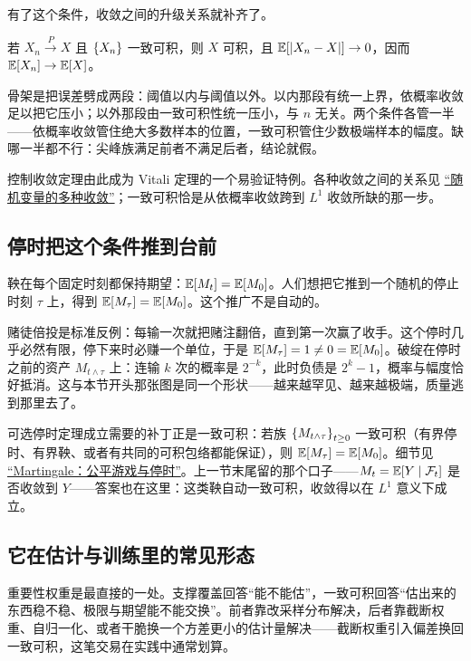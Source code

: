 有了这个条件，收敛之间的升级关系就补齐了。

\begin{theorem}[Vitali]
若 \(X_n\xrightarrow{\;P\;}X\) 且 \(\left\{X_n\right\}\) 一致可积，则 \(X\) 可积，且 \(\mathbb{E}[\left|X_n-X\right|]\to 0\)，因而 \(\mathbb{E}[X_n]\to\mathbb{E}[X]\)。
\end{theorem}

骨架是把误差劈成两段：阈值以内与阈值以外。以内那段有统一上界，依概率收敛足以把它压小；以外那段由一致可积性统一压小，与 \(n\) 无关。两个条件各管一半——依概率收敛管住绝大多数样本的位置，一致可积管住少数极端样本的幅度。缺哪一半都不行：尖峰族满足前者不满足后者，结论就假。

控制收敛定理由此成为 Vitali 定理的一个易验证特例。各种收敛之间的关系见 \hyperref[sec:05-Probability/08-Limit-Theorems/01]{``随机变量的多种收敛''}；一致可积恰是从依概率收敛跨到 \(L^1\) 收敛所缺的那一步。

\subsection{停时把这个条件推到台前}

鞅在每个固定时刻都保持期望：\(\mathbb{E}[M_t]=\mathbb{E}[M_0]\)。人们想把它推到一个随机的停止时刻 \(\tau\) 上，得到 \(\mathbb{E}[M_\tau]=\mathbb{E}[M_0]\)。这个推广不是自动的。

赌徒倍投是标准反例：每输一次就把赌注翻倍，直到第一次赢了收手。这个停时几乎必然有限，停下来时必赚一个单位，于是 \(\mathbb{E}[M_\tau]=1\ne 0=\mathbb{E}[M_0]\)。破绽在停时之前的资产 \(M_{t\wedge\tau}\) 上：连输 \(k\) 次的概率是 \(2^{-k}\)，此时负债是 \(2^{k}-1\)，概率与幅度恰好抵消。这与本节开头那张图是同一个形状——越来越罕见、越来越极端，质量逃到那里去了。

可选停时定理成立需要的补丁正是一致可积：若族 \(\left\{M_{t\wedge\tau}\right\}_{t\ge 0}\) 一致可积（有界停时、有界鞅、或者有共同的可积包络都能保证），则 \(\mathbb{E}[M_\tau]=\mathbb{E}[M_0]\)。细节见 \hyperref[sec:06-Random-Processes/04-Applications/02]{``Martingale：公平游戏与停时''}。上一节末尾留的那个口子——\(M_t=\mathbb{E}[Y\mid\mathcal F_t]\) 是否收敛到 \(Y\)——答案也在这里：这类鞅自动一致可积，收敛得以在 \(L^1\) 意义下成立。

\subsection{它在估计与训练里的常见形态}

重要性权重是最直接的一处。支撑覆盖回答``能不能估''，一致可积回答``估出来的东西稳不稳、极限与期望能不能交换''。前者靠改采样分布解决，后者靠截断权重、自归一化、或者干脆换一个方差更小的估计量解决——截断权重引入偏差换回一致可积，这笔交易在实践中通常划算。

